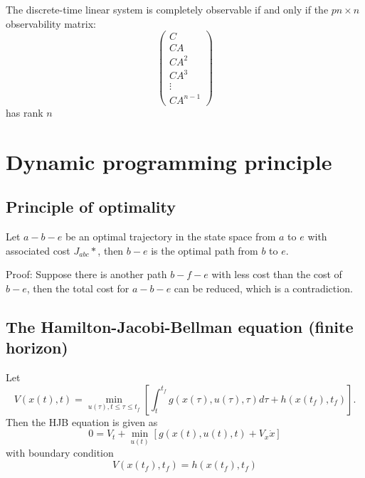 \begin{refsection}
\begin{theorem}
\cite{luenberger1979introduction}The discrete-time linear system is completely observable if and only if the $pn \times n$ observability matrix:
$$
\begin{pmatrix}C\\CA\\CA^2\\CA^3\\ \vdots \\CA^{n-1} \end{pmatrix}
$$
has rank $n$
\end{theorem}


\fi



\section{Dynamic programming principle}
\subsection{Principle of optimality}
\begin{lemma}
\cite[54]{kirk2012optimal}Let $a-b-e$ be an optimal trajectory in the state space from $a$ to $e$ with associated cost $J_{abc}*$, then $b-e$ is the optimal path from $b$ to $e$.
\end{lemma}
Proof: Suppose there is another path $b-f-e$ with less cost than the cost of $b-e$, then the total cost for $a-b-e$ can be reduced, which is a contradiction.


\subsection{The Hamilton-Jacobi-Bellman equation (finite horizon)}
\begin{theorem}\label{ch:deterministic-optimal-control-theory:th:HJBfinitehorizon} \cite[88]{kirk2012optimal}
	Let $$V(x(t),t)=\min_{u(\tau),t\leq \tau \leq t_f}[ \int_t^{t_f} g(x(\tau),u(\tau),\tau) d\tau + h(x(t_f),t_f) ].$$
	Then the HJB equation is given as
	$$0 = V_t + \min_{u(t)}[ g(x(t),u(t),t) + V_x\dot{x}] $$
	with boundary condition 
	$$V(x(t_f),t_f) = h(x(t_f),t_f)$$
	
\end{theorem}


\end{refsection}
